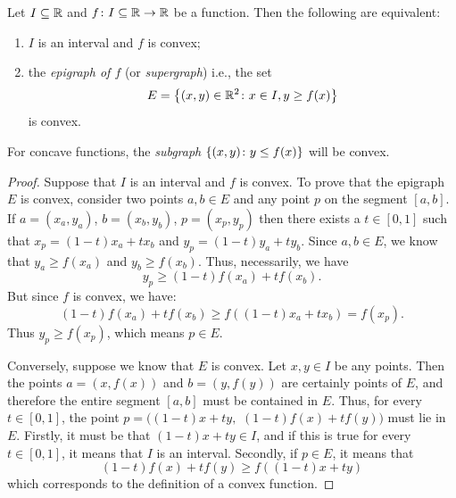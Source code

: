 \begin{theorem}
Let $I\subseteq {\mathbb R}$ and $f\colon I\subseteq {\mathbb R}\to {\mathbb R}$ be a function.
Then the following are equivalent:
\begin{enumerate}
\item $I$ is an interval and $f$ is convex;
\item the \emph{epigraph of $f$}%
%
%
(or \emph{supergraph})
%
i.e., the set
\[
  E = {\left\{ (x,y)\in {\mathbb R}^2\colon x\in I, y\ge f(x) \right\}}
\]
is convex.
\end{enumerate}

For concave functions, the \emph{subgraph} ${\left\{ (x,y)\colon y\le f(x) \right\}}$
will be convex.
\end{theorem}
%
\begin{proof}
Suppose that $I$ is an interval and $f$ is convex. 
To prove that the epigraph $E$ is convex, consider two points $a,b\in E$ 
and any point $p$ on the segment $[a,b]$.
If $a=(x_a, y_a)$, $b=(x_b,y_b)$, $p=(x_p, y_p)$
then there exists a $t\in [0,1]$ such that $x_p = (1-t)x_a + t x_b$ and
$y_p=(1-t)y_a + t y_b$.
Since $a,b\in E$, we know that $y_a \ge f(x_a)$ and $y_b\ge f(x_b)$. 
Thus, necessarily, we have
\[
  y_p \ge (1-t)f(x_a) + t f(x_b).
\]
But since $f$ is convex, we have:
\[
  (1-t)f(x_a) + t f(x_b) \ge f((1-t)x_a + t x_b) = f(x_p).
\]
Thus $y_p\ge f(x_p)$, which means $p\in E$.

Conversely, suppose we know that $E$ is convex. Let $x,y\in I$ be any points.
Then the points $a=(x,f(x))$ and $b=(y,f(y))$ are certainly points of $E$, and
therefore the entire segment $[a,b]$ must be contained in $E$. Thus, for every
$t\in [0,1]$, the point $p = ((1-t)x + t y,$ $(1-t)f(x)+ tf(y))$ must lie in
$E$. Firstly, it must be that $(1-t)x+ty\in I$, and if this is true for every
$t\in[0,1]$, it means that $I$ is an interval. Secondly, if $p\in E$, it means
that
\[
  (1-t)f(x) +t f(y) \ge f((1-t)x + t y)
\]
which corresponds to the definition of a convex function.
\end{proof}


